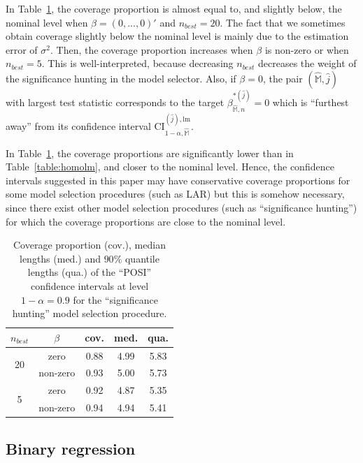 \documentclass[preprint]{imsart}
\newcommand{\M}{\mathbb M}
\numberwithin{equation}{section}
\begin{document}
In Table~\ref{table:homolm:significance:hunting}, the coverage proportion is almost equal to, and slightly below, the nominal level when $\beta = (0,...,0)'$ and $n_{best}=20$. The fact that we sometimes obtain coverage slightly below the nominal level is mainly due to the estimation error of $\sigma^2$. Then, the coverage proportion increases when $\beta$ is non-zero or when $n_{best} = 5$. This is well-interpreted, because decreasing $n_{best}$ decreases the weight of the significance hunting in the model selector. Also, if $\beta=0$, the pair $(\hat{\mathbb{M}},\hat{j})$ with largest test statistic corresponds to the target $\beta_{\hat{\M},n}^{*(\hat{j})}=0$ which is ``furthest away'' from its confidence interval $\mathrm{CI}_{1-\alpha, \hat{\mathbb{M}}}^{(\hat{j}), \mathrm{lm}}$. 

In Table~\ref{table:homolm:significance:hunting}, the coverage proportions are significantly lower than in Table~\ref{table:homolm}, and closer to the nominal level. Hence, the confidence intervals suggested in this paper may have conservative coverage proportions for some model selection procedures (such as LAR) but this is somehow necessary, since there exist other model selection procedures (such as ``significance hunting'') for which the coverage proportions are close to the nominal level.


\begin{table}[tbp]
\begin{center}
\begin{tabular}{c|c|ccc}
$n_{best}$ & $\beta$ & cov. & med. & qua. \\ \hline
\multirow{2}{*}{20} & zero & 0.88 & 4.99 & 5.83  \\ \cline{2-5}
 & non-zero & 0.93 & 5.00 & 5.73  \\ \hline
\multirow{2}{*}{5} & zero &  0.92 & 4.87 & 5.35  \\ \cline{2-5}
 & non-zero & 0.94 & 4.94 & 5.41
\end{tabular}%
\end{center}
\caption{Coverage proportion (cov.), median lengths (med.) and $90 \%$ quantile lengths (qua.) of the ``POSI'' confidence intervals at level $1-\alpha=0.9$ for the ``significance hunting'' model selection procedure.}
\label{table:homolm:significance:hunting}
\end{table}



\subsection{Binary regression}
\end{document}
